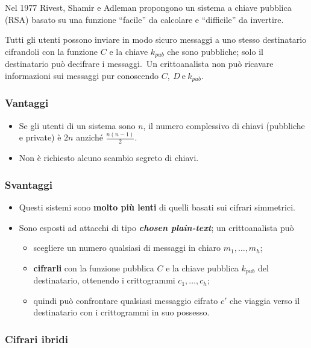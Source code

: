 Nel 1977 Rivest, Shamir e Adleman propongono un sistema a chiave pubblica (RSA) basato su una funzione ``facile'' da calcolare e ``difficile'' da invertire.\

Tutti gli utenti possono inviare in modo sicuro messaggi a uno stesso destinatario cifrandoli con la funzione $C$ e la chiave $k_{pub}$ che sono pubbliche; solo il destinatario può decifrare i messaggi.\
Un crittoanalista non può ricavare informazioni sui messaggi pur conoscendo $C,\ D\ \mathrm{e}\ k_{pub}$.\

\subsubsection{Vantaggi}

\begin{itemize}
    \item Se gli utenti di un sistema sono $n$, il numero complessivo di chiavi (pubbliche e private) è $2n$ anziché $\frac{n(n-1)}{2}$.\
    \item Non è richiesto alcuno scambio segreto di chiavi.
\end{itemize}

\subsubsection{Svantaggi}

\begin{itemize}
    \item Questi sistemi sono \textbf{molto più lenti} di quelli basati sui cifrari simmetrici.\
    \item Sono esposti ad attacchi di tipo \textbf{\textit{chosen plain-text}}; un crittoanalista può
          \begin{itemize}
              \item scegliere un numero qualsiasi di messaggi in chiaro $m_1,\dots, m_{h}$;
              \item \textbf{cifrarli} con la funzione pubblica $C$ e la chiave pubblica $k_{pub}$ del destinatario, ottenendo i crittogrammi $c_1,\dots,c_h$;
              \item quindi può confrontare qualsiasi messaggio cifrato $c'$ che viaggia verso il destinatario con i crittogrammi in suo possesso.\
          \end{itemize}
\end{itemize}

\subsubsection{Cifrari ibridi}

